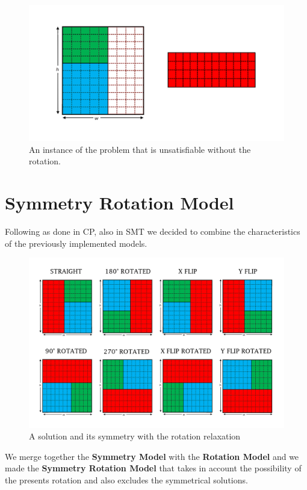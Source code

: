 \begin{figure}
	\centering
	\includegraphics[width=\textwidth]{images/rotated_problem.png}
	\caption{An instance of the problem that is unsatisfiable without the rotation.}
	\label{fig:overlaps}
\end{figure}



\section{Symmetry Rotation Model}
Following as done in CP, also in SMT we decided to combine the characteristics of the previously implemented models.

\begin{figure}
	\centering
	\includegraphics[width=\textwidth]{images/rotated_simmetry.png}
	\caption{A solution and its symmetry with the rotation relaxation}
	\label{fig:overlaps}
\end{figure}

We merge together the \textbf{Symmetry Model} with the \textbf{Rotation Model} and we made
the \textbf{Symmetry Rotation Model} that takes in account the possibility of the presents rotation and also excludes the symmetrical
solutions.

